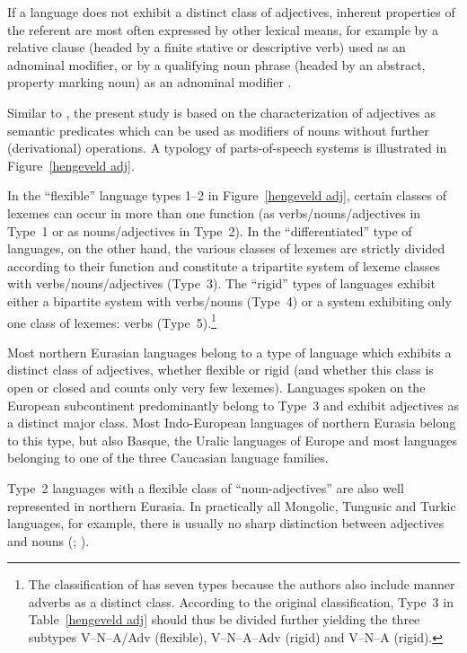 If a language does not exhibit a distinct class of adjectives, inherent properties of the referent are most often expressed by other lexical means, for example by a relative clause (headed by a finite stative or descriptive verb) used as an adnominal modifier, or by a qualifying noun phrase (headed by an abstract, property marking noun) as an adnominal modifier \citep[cf.][100]{rijkhoff2002}.

Similar to \citet{hengeveld-etal2004}, the present study is based on the characterization of adjectives as semantic predicates which can be used as modifiers of nouns without further (derivational) operations. A typology of parts-of-speech systems is illustrated in Figure~\ref{hengeveld adj}.

In the “flexible” language types 1–2 in Figure~\ref{hengeveld adj}, certain classes of lexemes can occur in more than one function (as verbs/nouns/adjectives in Type~1 or as nouns/adjectives in Type~2). In the “differentiated” type of languages, on the other hand, the various classes of lexemes are strictly divided according to their function and constitute a tripartite system of lexeme classes with verbs\slash{}nouns\slash{}adjectives (Type~3). The “rigid” types of languages exhibit either a bipartite system with verbs/nouns (Type~4) or a system exhibiting only one class of lexemes: verbs (Type~5).\footnote{The classification of \citet{hengeveld-etal2004} has seven types because the authors also include manner adverbs as a distinct class. According to the original classification, Type~3 in Table~\ref{hengeveld adj} should thus be divided further yielding the three subtypes V–N–A/Adv (flexible), V–N–A–Adv (rigid) and V–N–A (rigid).}

Most northern Eurasian languages belong to a type of language which exhibits a distinct class of adjectives, whether flexible or rigid (and whether this class is open or closed and counts only very few lexemes). Languages spoken on the European subcontinent predominantly belong to Type~3 and exhibit adjectives as a distinct major class. Most Indo-European languages of northern Eurasia belong to this type, but also Basque, the Uralic languages of Europe and most languages belonging to one of the three Caucasian language families.

Type~2 languages with a flexible class of “noun-adjectives” are also well represented in northern Eurasia. In practically all Mongolic, Tungusic and Turkic languages, for example, there is usually no sharp distinction between adjectives and nouns (\citealt[122–123]{rijkhoff2002}; \citealt[9]{poppe1964}).

